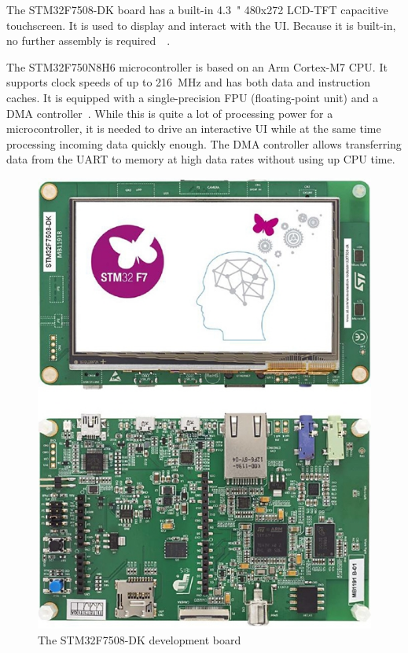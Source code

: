 The STM32F7508-DK board has a built-in \SI{4.3}{"} 480x272 LCD-TFT capacitive touchscreen. It is
used to display and interact with the UI. Because it is built-in, no further assembly is required~\
\cite{board-user-manual}.

The STM32F750N8H6 microcontroller is based on an Arm Cortex-M7 CPU. It supports clock speeds of up to
\SI{216}{\mega\hertz} and has both data and instruction caches. It is equipped with a single-precision
FPU (floating-point unit) and a DMA controller~\cite{mcu-datasheet}. While this is quite a lot of
processing power for a microcontroller, it is needed to drive an interactive UI while at the same time
processing incoming data quickly enough. The DMA controller allows transferring data from the UART to
memory at high data rates without using up CPU time.

\begin{figure}[h]
    \centering
    \includegraphics[scale=0.4]{img/board.jpg}
    \caption[The STM32F7508-DK development board]{
        The STM32F7508-DK development board\footnotemark
    }
\end{figure}

